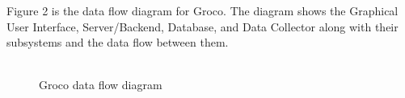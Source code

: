 Figure 2 is the data flow diagram for Groco. The diagram shows the Graphical User Interface, Server/Backend, Database, and Data Collector along with their subsystems and the data flow between them. 

\begin{figure}[h!]
	\centering
 	\includegraphics[width=0.5]{images/flowChart}
 \caption{Groco data flow diagram}
\end{figure}